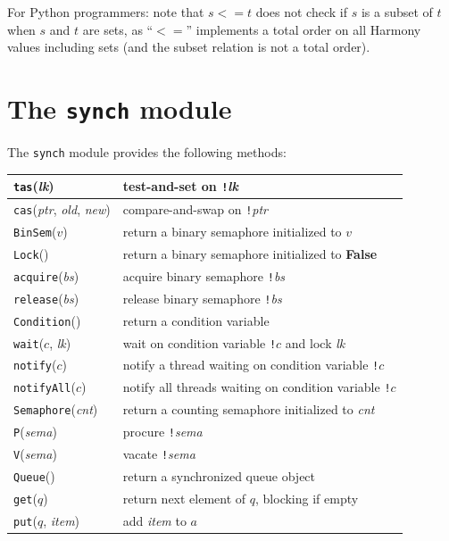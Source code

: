\documentclass{report}
\begin{document}
\vspace{1em}
For Python programmers: note that $s <= t$ does not check if $s$ is a subset of
$t$ when $s$ and $t$ are sets, as ``$<=$'' implements a total order on all Harmony values including sets (and the subset relation is not a total order).

\section{The \texttt{synch} module}

%
The \texttt{synch} module provides the following methods:

\vspace{1em}
\begin{tabular}{|l|l|}
\hline
\texttt{tas}(\textit{lk}) & test-and-set on \texttt{!}\textit{lk} \\
\hline
\texttt{cas}(\textit{ptr}, \textit{old}, \textit{new}) & compare-and-swap on \texttt{!}\textit{ptr} \\
\hline
\texttt{BinSem}($v$) & return a binary semaphore initialized to $v$ \\
\hline
\texttt{Lock}() & return a binary semaphore initialized to \textbf{False} \\
\hline
\texttt{acquire}(\textit{bs}) & acquire binary semaphore \texttt{!}\textit{bs} \\
\hline
\texttt{release}(\textit{bs}) & release binary semaphore \texttt{!}\textit{bs} \\
\hline
\texttt{Condition}() & return a condition variable \\
\hline
\texttt{wait}($c$, \textit{lk}) & wait on condition variable \texttt{!}$c$
and lock \textit{lk} \\ \hline
\texttt{notify}($c$) & notify a thread waiting on condition variable \texttt{!}$c$ \\
\hline
\texttt{notifyAll}($c$) & notify all threads waiting on condition variable \texttt{!}$c$ \\
\hline
\texttt{Semaphore}(\textit{cnt}) & return a counting semaphore initialized to \textit{cnt} \\
\hline
\texttt{P}(\textit{sema}) & procure \texttt{!}\textit{sema}  \\
\hline
\texttt{V}(\textit{sema}) & vacate \texttt{!}\textit{sema}  \\
\hline
\texttt{Queue}() & return a synchronized queue object \\
\hline
\texttt{get}($q$) & return next element of $q$, blocking if empty \\
\hline
\texttt{put}($q$, \textit{item}) & add \textit{item} to $a$ \\
\hline
\end{tabular}
\end{document}
